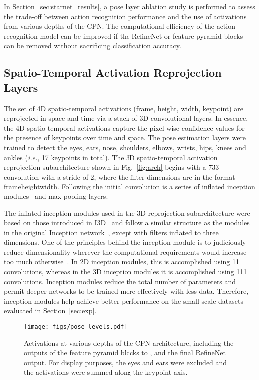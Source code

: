 \documentclass[10pt, conference, compsocconf]{IEEEtran}
\begin{document}
In Section~\ref{sec:starnet_results}, a pose layer ablation study is performed to assess the trade-off between action recognition performance and the use of activations from various depths of the CPN. The computational efficiency of the action recognition model can be improved if the RefineNet or feature pyramid blocks can be removed without sacrificing classification accuracy.

\subsection{Spatio-Temporal Activation Reprojection Layers}

The set of 4D spatio-temporal activations (frame, height, width, keypoint) are reprojected in space and time via a stack of 3D convolutional layers.  In essence, the 4D spatio-temporal activations capture the pixel-wise confidence values for the presence of keypoints over time and space. The pose estimation layers were trained to detect the eyes, ears, nose, shoulders, elbows, wrists, hips, knees and ankles (\textit{i.e.}, 17 keypoints in total).  The 3D spatio-temporal activation reprojection subarchitecture shown in Fig.~\ref{fig:arch} begins with a 733 convolution with a stride of 2, where the filter dimensions are in the format frameheightwidth. Following the initial convolution is a series of inflated inception modules~\cite{carreira2017quo} and max pooling layers. 

The inflated inception modules used in the 3D reprojection subarchitecture were based on those introduced in I3D~\cite{carreira2017quo} and follow a similar structure as the modules in the original Inception network~\cite{szegedy2015going}, except with filters inflated to three dimensions. One of the principles behind the inception module is to judiciously reduce dimensionality wherever the computational requirements would increase too much otherwise~\cite{szegedy2015going}. In 2D inception modules, this is accomplished using 11 convolutions, whereas in the 3D inception modules it is accomplished using 111 convolutions. Inception modules reduce the total number of parameters and permit deeper networks to be trained more effectively with less data. Therefore, inception modules help achieve better performance on the small-scale datasets evaluated in Section~\ref{sec:exp}.

\begin{figure*}[t]
    \vspace{-10pt}
    \centering
    \texttt{[image: figs/pose\_levels.pdf]}
    \vspace{-10pt}
    \caption{Activations at various depths of the CPN architecture, including the outputs of the feature pyramid blocks  to , and the final RefineNet output. For display purposes, the eyes and ears were excluded and the activations were summed along the keypoint axis.}
    \label{fig:pose_levels}
    \vspace{-15pt}
\end{figure*}
\end{document}
